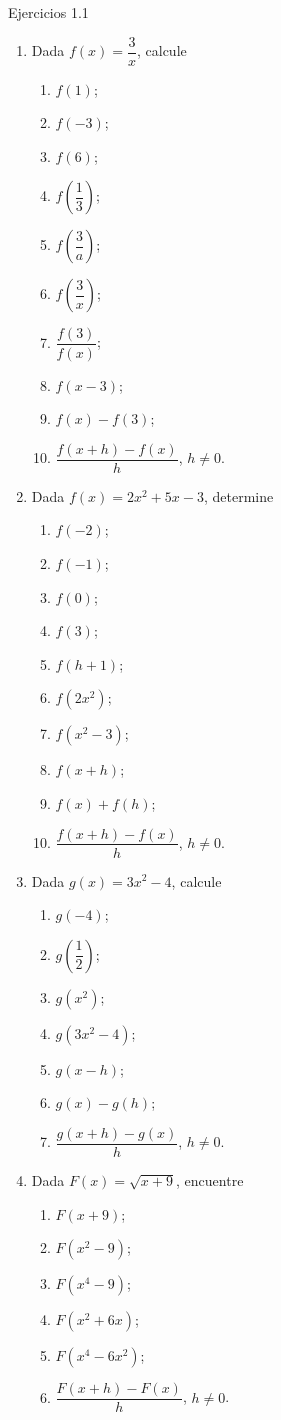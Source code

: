\documentclass[aspectratio=169,10pt]{beamer}
\begin{document}
\begin{frame}{Ejercicios 1.1}
\begin{enumerate}
\item Dada $f(x)=\dfrac{3}{x}$, calcule
\begin{enumerate}
\item $f(1)$; \item $f(-3)$; \item $f(6)$; \item $f\!\left(\dfrac13\right)$;
\item $f\!\left(\dfrac3a\right)$; \item $f\!\left(\dfrac3x\right)$;
\item $\dfrac{f(3)}{f(x)}$; \item $f(x-3)$; \item $f(x)-f(3)$;
\item $\dfrac{f(x+h)-f(x)}{h}$, $h\ne0$.
\end{enumerate}

\item Dada $f(x)=2x^2+5x-3$, determine
\begin{enumerate}
\item $f(-2)$; \item $f(-1)$; \item $f(0)$; \item $f(3)$; \item $f(h+1)$;
\item $f(2x^2)$; \item $f(x^2-3)$; \item $f(x+h)$; \item $f(x)+f(h)$;
\item $\dfrac{f(x+h)-f(x)}{h}$, $h\ne0$.
\end{enumerate}

\item Dada $g(x)=3x^2-4$, calcule
\begin{enumerate}
\item $g(-4)$; \item $g\!\left(\dfrac12\right)$; \item $g(x^2)$; \item $g(3x^2-4)$;
\item $g(x-h)$; \item $g(x)-g(h)$;
\item $\dfrac{g(x+h)-g(x)}{h}$, $h\ne0$.
\end{enumerate}

\item Dada $F(x)=\sqrt{x+9}$, encuentre
\begin{enumerate}
\item $F(x+9)$; \item $F(x^2-9)$; \item $F(x^4-9)$; \item $F(x^2+6x)$;
\item $F(x^4-6x^2)$; \item $\dfrac{F(x+h)-F(x)}{h}$, $h\ne0$.
\end{enumerate}


\end{enumerate}
\end{frame}
\end{document}

